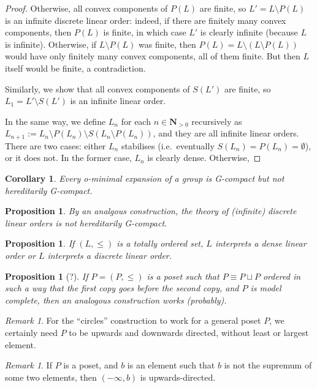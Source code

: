 \documentclass[final,a4paper,12pt]{amsart}
\newcommand{\bN}{{\mathbf{N}}}
\newtheorem{cor}[thm]{Corollary}
\newtheorem{prop}[thm]{Proposition}
\theoremstyle{remark}
\newtheorem{rem}[thm]{Remark}
\theoremstyle{definition}
\begin{document}
\begin{proof}
		Otherwise, all convex components of $P(L)$ are finite, so $L'=L\setminus P(L)$ is an infinite discrete linear order: indeed, if there are finitely many convex components, then $P(L)$ is finite, in which case $L'$ is clearly infinite (because $L$ is infinite). Otherwise, if $L\setminus P(L)$ was finite, then $P(L)=L\setminus(L\setminus P(L))$ would have only finitely many convex components, all of them finite. But then $L$ itself would be finite, a contradiction.
		
		Similarly, we show that all convex components of $S(L')$ are finite, so $L_1=L'\setminus S(L')$ is an infinite linear order.
		
		In the same way, we define $L_n$ for each $n\in \bN_{>0}$ recursively as $L_{n+1}:=L_{n}\setminus P(L_n)\setminus S(L_n\setminus P(L_n))$, and they are all infinite linear orders. There are two cases: either $L_n$ stabilises (i.e.\ eventually $S(L_n)=P(L_n)=\emptyset$), or it does not. In the former case, $L_n$ is clearly dense. Otherwise,
	\end{proof}
	
	
	\begin{cor}
		Every o-minimal expansion of a group is G-compact but not hereditarily G-compact.
	\end{cor}
	
	\begin{prop}
		By an analgous construction, the theory of (infinite) discrete linear orders is not hereditarily G-compact.
	\end{prop}
	
	\begin{prop}
		If $(L,\leq)$ is a totally ordered set, $L$ interprets a dense linear order or $L$ interprets a discrete linear order.
	\end{prop}
	
	\begin{prop}[?]
		If $P=(P,\leq)$ is a poset such that $P\equiv P\sqcup P$ ordered in such a way that the first copy goes before the second copy, and $P$ is model complete, then an analogous construction works (probably).
	\end{prop}
	
	\begin{rem}
		For the ``circles'' construction to work for a general poset $P$, we certainly need $P$ to be upwards and downwards directed, without least or largest element.
	\end{rem}
	
	\begin{rem}
		If $P$ is a poset, and $b$ is an element such that $b$ is not the supremum of some two elements, then $(-\infty,b)$ is upwards-directed.
	\end{rem}
	
\end{document}

